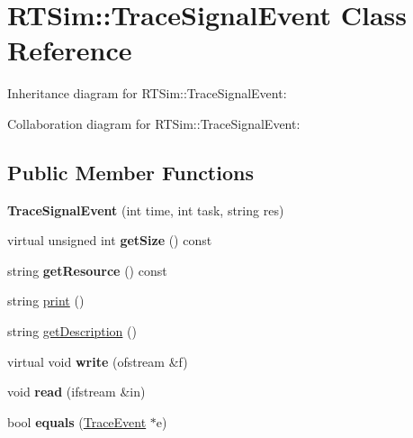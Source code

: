 \hypertarget{classRTSim_1_1TraceSignalEvent}{}\section{R\+T\+Sim\+:\+:Trace\+Signal\+Event Class Reference}
\label{classRTSim_1_1TraceSignalEvent}


Inheritance diagram for R\+T\+Sim\+:\+:Trace\+Signal\+Event\+:


Collaboration diagram for R\+T\+Sim\+:\+:Trace\+Signal\+Event\+:
\subsection*{Public Member Functions}
\begin{DoxyCompactItemize}
\item 
{\bfseries Trace\+Signal\+Event} (int time, int task, string res)\hypertarget{classRTSim_1_1TraceSignalEvent_acb8ba9b7eeb4325330fb79949b491504}{}\label{classRTSim_1_1TraceSignalEvent_acb8ba9b7eeb4325330fb79949b491504}

\item 
virtual unsigned int {\bfseries get\+Size} () const \hypertarget{classRTSim_1_1TraceSignalEvent_a91c22a628047632a408c0a33f7069733}{}\label{classRTSim_1_1TraceSignalEvent_a91c22a628047632a408c0a33f7069733}

\item 
string {\bfseries get\+Resource} () const \hypertarget{classRTSim_1_1TraceSignalEvent_ad8246c3e09c2a053fbd9883ebb52623e}{}\label{classRTSim_1_1TraceSignalEvent_ad8246c3e09c2a053fbd9883ebb52623e}

\item 
string \hyperlink{classRTSim_1_1TraceSignalEvent_ab5ef051242406f6a1e525546aee43e1b}{print} ()
\item 
string \hyperlink{classRTSim_1_1TraceSignalEvent_a94f37526ad98b1f10e5c8d6bfaf66393}{get\+Description} ()
\item 
virtual void {\bfseries write} (ofstream \&f)\hypertarget{classRTSim_1_1TraceSignalEvent_aae3082a1b4feb086a9e46a54a96be4b1}{}\label{classRTSim_1_1TraceSignalEvent_aae3082a1b4feb086a9e46a54a96be4b1}

\item 
void {\bfseries read} (ifstream \&in)\hypertarget{classRTSim_1_1TraceSignalEvent_acf886cd301464b994a3fc0a120dc8441}{}\label{classRTSim_1_1TraceSignalEvent_acf886cd301464b994a3fc0a120dc8441}

\item 
bool {\bfseries equals} (\hyperlink{classRTSim_1_1TraceEvent}{Trace\+Event} $\ast$e)\hypertarget{classRTSim_1_1TraceSignalEvent_ae4ac18384ab613349cdec70f42a65362}{}\label{classRTSim_1_1TraceSignalEvent_ae4ac18384ab613349cdec70f42a65362}

\end{DoxyCompactItemize}
